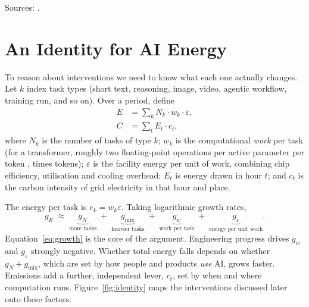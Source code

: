 \documentclass[11pt]{article}
\theoremstyle{definition}
\theoremstyle{remark}
\begin{document}
\noindent Sources: \citet{elsworth2025,iea2025,iea2026,mittr2025,owid2026,shehabi2024}.

\section{An Identity for AI Energy}\label{sec:identity}

To reason about interventions we need to know what each one actually changes. Let $k$ index task types (short text, reasoning, image, video, agentic workflow, training run, and so on). Over a period, define
\begin{align}
  E &= \sum_{k} N_k \cdot w_k \cdot \varepsilon, \label{eq:identity}\\
  C &= \sum_{t} E_t \cdot c_t, \label{eq:carbon}
\end{align}
where $N_k$ is the number of tasks of type $k$; $w_k$ is the computational \emph{work} per task (for a transformer, roughly two floating-point operations per active parameter per token \citep{kaplan2020}, times tokens); $\varepsilon$ is the facility energy per unit of work, combining chip efficiency, utilisation and cooling overhead; $E_t$ is energy drawn in hour $t$; and $c_t$ is the carbon intensity of grid electricity in that hour and place.

The energy per task is $e_k = w_k\varepsilon$. Taking logarithmic growth rates,
\begin{equation}
  g_E \;\approx\; \underbrace{g_N}_{\text{more tasks}} \;+\; \underbrace{g_{\text{mix}}}_{\text{heavier tasks}} \;+\; \underbrace{g_w}_{\text{work per task}} \;+\; \underbrace{g_\varepsilon}_{\text{energy per unit work}} .
  \label{eq:growth}
\end{equation}
Equation~\eqref{eq:growth} is the core of the argument. Engineering progress drives $g_w$ and $g_\varepsilon$ strongly negative. Whether total energy falls depends on whether $g_N + g_{\text{mix}}$, which are set by how people and products \emph{use} AI, grows faster. Emissions add a further, independent lever, $c_t$, set by when and where computation runs. Figure~\ref{fig:identity} maps the interventions discussed later onto these factors.
\end{document}
